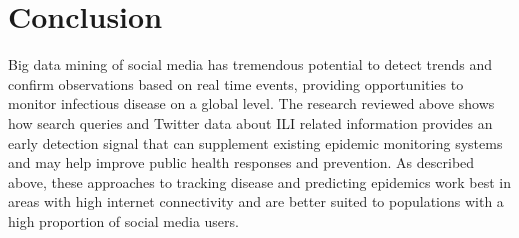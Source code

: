 \documentclass[sigconf]{acmart}
\begin{document}
\section{Conclusion}

Big data mining of social media has tremendous potential to detect trends and confirm 
observations based on real time events, providing opportunities to monitor infectious 
disease on a global level. The research reviewed above shows how search queries and 
Twitter data about ILI related information provides an early detection signal that can
supplement existing epidemic monitoring systems and may help improve public health 
responses and prevention. As described above, these approaches to tracking disease and
predicting epidemics work best in areas with high internet connectivity and are better 
suited to populations with a high proportion of social media users.


 
\end{document}
